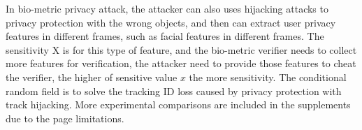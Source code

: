\documentclass[letterpaper]{article} %
\begin{document}
In bio-metric privacy attack, the attacker can also uses hijacking attacks to privacy protection with the wrong objects, and then can extract user privacy features in different frames, such as facial features in different frames. The sensitivity X is for this type of feature, and the bio-metric verifier needs to collect more features for verification, the attacker need to provide those features to cheat the verifier, the higher of sensitive value $x$ the more sensitivity. The conditional random field is to solve the tracking ID loss caused by privacy protection with track hijacking. More experimental comparisons are included in the supplements due to the page limitations.
\end{document}
